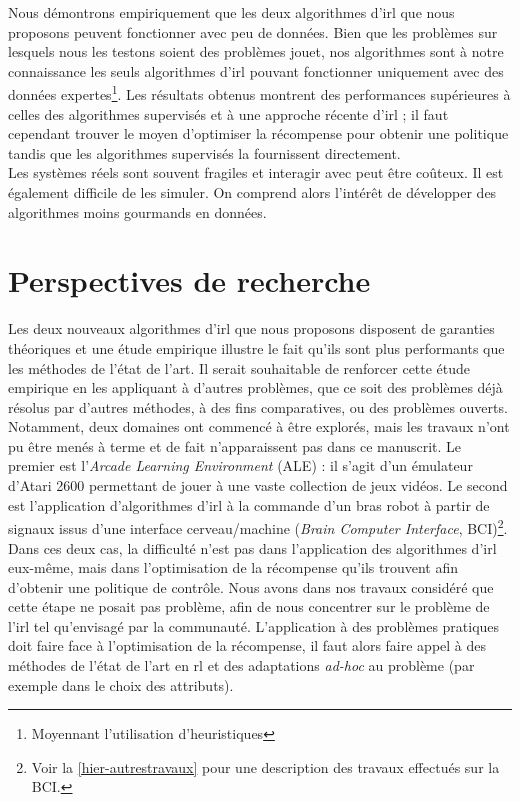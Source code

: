\documentclass[frenchb,a4paper,justified,notoc]{tufte-book}
\begin{document}
Nous démontrons empiriquement que les deux algorithmes d'\gls{irl} que nous proposons peuvent fonctionner avec peu de données. Bien que les problèmes sur lesquels nous les testons soient des problèmes jouet, nos algorithmes sont à notre connaissance les seuls algorithmes d'\gls{irl} pouvant fonctionner uniquement avec des données expertes\footnote{Moyennant l'utilisation d'heuristiques
 }. Les résultats obtenus montrent des performances supérieures à celles des algorithmes supervisés et à une approche récente d'\gls{irl} ; il faut cependant trouver le moyen d'optimiser la récompense pour obtenir une politique tandis que les algorithmes supervisés la fournissent directement.\\

Les systèmes réels sont souvent fragiles et interagir avec peut être coûteux. Il est également difficile de les simuler. On comprend alors l'intérêt de développer des algorithmes moins gourmands en données.
\section{Perspectives de recherche}
\label{sec-7-2}

Les deux nouveaux algorithmes d'\gls{irl} que nous proposons disposent de garanties théoriques et une étude empirique illustre le fait qu'ils sont plus performants que les méthodes de l'état de l'art. Il serait souhaitable de renforcer cette étude empirique en les appliquant à d'autres problèmes, que ce soit des problèmes déjà résolus par d'autres méthodes, à des fins comparatives, ou des problèmes ouverts. Notamment, deux domaines ont commencé à être explorés, mais les travaux n'ont pu être menés à terme et de fait n'apparaissent pas dans ce manuscrit. Le premier est l'\emph{Arcade Learning Environment} (ALE) : il s'agit d'un émulateur d'Atari 2600 permettant de jouer à une vaste collection de jeux vidéos. Le second est l'application d'algorithmes d'\gls{irl} à la commande d'un bras robot à partir de signaux issus d'une interface cerveau/machine (\emph{Brain Computer Interface}, BCI)\footnote{Voir la \autoref{hier-autrestravaux} pour une description des travaux effectués sur la BCI.
 }.  Dans ces deux cas, la difficulté n'est pas dans l'application des algorithmes d'\gls{irl} eux-même, mais dans l'optimisation de la récompense qu'ils trouvent afin d'obtenir une politique de contrôle. Nous avons dans nos travaux considéré que cette étape ne posait pas problème, afin de nous concentrer sur le problème de l'\gls{irl} tel qu'envisagé par la communauté. L'application à des problèmes pratiques doit faire face à l'optimisation de la récompense, il faut alors faire appel à des méthodes de l'état de l'art en \gls{rl} et des adaptations \emph{ad-hoc} au problème (par exemple dans le choix des attributs).
\end{document}
